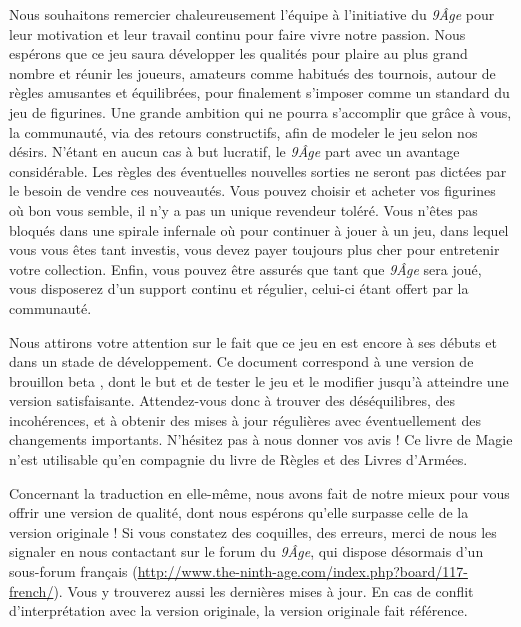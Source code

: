 \begin{titlepage}
{\fontsize{12}{14.4}\selectfont
{}
\vspace{0.5cm}

Nous souhaitons remercier chaleureusement l'équipe à l'initiative du \emph{9\ieme Âge} pour leur motivation et leur travail continu pour faire vivre notre passion. Nous espérons que ce jeu saura développer les qualités pour plaire au plus grand nombre et réunir les joueurs, amateurs comme habitués des tournois, autour de règles amusantes et équilibrées, pour finalement s'imposer comme un standard du jeu de figurines. Une grande ambition qui ne pourra s'accomplir que grâce à vous, la communauté, via des retours constructifs, afin de modeler le jeu selon nos désirs. N'étant en aucun cas à but lucratif, le \emph{9\ieme Âge} part avec un avantage considérable. Les règles des éventuelles nouvelles sorties ne seront pas dictées par le besoin de vendre ces nouveautés. Vous pouvez choisir et acheter vos figurines où bon vous semble, il n'y a pas un unique revendeur toléré. Vous n'êtes pas bloqués dans une spirale infernale où pour continuer à jouer à un jeu, dans lequel vous vous êtes tant investis, vous devez payer toujours plus cher pour entretenir votre collection. Enfin, vous pouvez être assurés que tant que \emph{9\ieme Âge} sera joué, vous disposerez d'un support continu et régulier, celui-ci étant offert par la communauté.

Nous attirons votre attention sur le fait que ce jeu en est encore à ses débuts et dans un stade de développement. Ce document correspond à une version de brouillon \og beta \fg , dont le but et de tester le jeu et le modifier jusqu'à atteindre une version satisfaisante. Attendez-vous donc à trouver des déséquilibres, des incohérences, et à obtenir des mises à jour régulières avec éventuellement des changements importants. N'hésitez pas à nous donner vos avis ! Ce livre de Magie n'est utilisable qu'en compagnie du livre de Règles et des Livres d'Armées.

Concernant la traduction en elle-même, nous avons fait de notre mieux pour vous offrir une version de qualité, dont nous espérons qu'elle surpasse celle de la version originale ! Si vous constatez des coquilles, des erreurs, merci de nous les signaler en nous contactant sur le forum du \emph{9\ieme Âge}, qui dispose désormais d'un sous-forum français (\url{http://www.the-ninth-age.com/index.php?board/117-french/}). Vous y trouverez aussi les dernières mises à jour. En cas de conflit d'interprétation avec la version originale, la version originale fait référence.

}
\end{titlepage}

